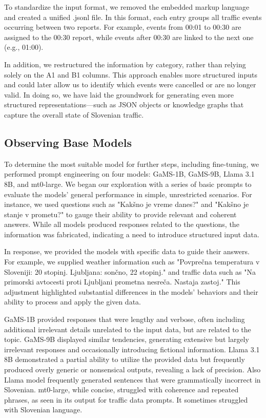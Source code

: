 \documentclass[fleqn,moreauthors,10pt]{ds_report}
\begin{document}
To standardize the input format, we removed the embedded markup language and created a unified .jsonl file. In this format, each entry groups all traffic events occurring between two reports. For example, events from 00:01 to 00:30 are assigned to the 00:30 report, while events after 00:30 are linked to the next one (e.g., 01:00).

In addition, we restructured the information by category, rather than relying solely on the A1 and B1 columns. This approach enables more structured inputs and could later allow us to identify which events were cancelled or are no longer valid. In doing so, we have laid the groundwork for generating even more structured representations—such as JSON objects or knowledge graphs that capture the overall state of Slovenian traffic.

\subsection*{Observing Base Models}

To determine the most suitable model for further steps, including fine-tuning, we performed prompt engineering on four models: GaMS-1B, GaMS-9B, Llama 3.1 8B, and mt0-large. We began our exploration with a series of basic prompts to evaluate the models' general performance in simple, unrestricted scenarios. For instance, we used questions such as "Kakšno je vreme danes?" and "Kakšno je stanje v prometu?" to gauge their ability to provide relevant and coherent answers. While all models produced responses related to the questions, the information was fabricated, indicating a need to introduce structured input data.

In response, we provided the models with specific data to guide their answers. For example, we supplied weather information such as "Povprečna temperatura v Sloveniji: 20 stopinj. Ljubljana: sončno, 22 stopinj." and traffic data such as "Na primorski avtocesti proti Ljubljani prometna nesreča. Nastaja zastoj." This adjustment highlighted substantial differences in the models' behaviors and their ability to process and apply the given data.

GaMS-1B provided responses that were lengthy and verbose, often including additional irrelevant details unrelated to the input data, but are related to the topic. GaMS-9B displayed similar tendencies, generating extensive but largely irrelevant responses and occasionally introducing fictional information. Llama 3.1 8B demonstrated a partial ability to utilize the provided data but frequently produced overly generic or nonsensical outputs, revealing a lack of precision. Also Llama model frequently generated sentences that were grammatically incorrect in Slovenian. mt0-large, while concise, struggled with coherence and repeated phrases, as seen in its output for traffic data prompts. It sometimes struggled with Slovenian language.
\end{document}
